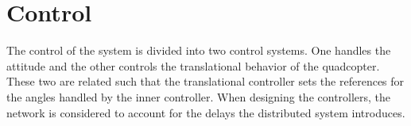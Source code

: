 \section{Control}\label{sec:control}
The control of the system is divided into two control systems. One handles the attitude and the other controls the translational behavior of the quadcopter. These two are related such that the translational controller sets the references for the angles handled by the inner controller. When designing the controllers, the network is considered to account for the delays the distributed system introduces. 